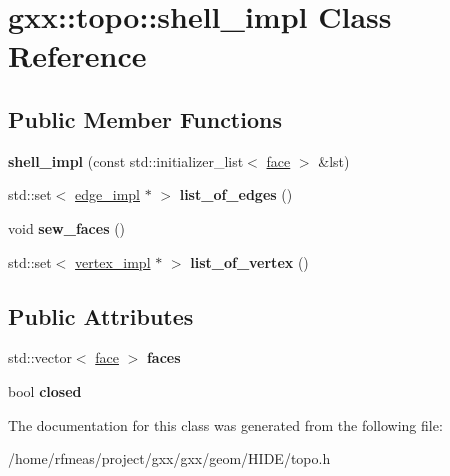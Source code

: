 \hypertarget{classgxx_1_1topo_1_1shell__impl}{}\section{gxx\+:\+:topo\+:\+:shell\+\_\+impl Class Reference}
\label{classgxx_1_1topo_1_1shell__impl}
\subsection*{Public Member Functions}
\begin{DoxyCompactItemize}
\item 
{\bfseries shell\+\_\+impl} (const std\+::initializer\+\_\+list$<$ \hyperlink{classgxx_1_1topo_1_1face}{face} $>$ \&lst)\hypertarget{classgxx_1_1topo_1_1shell__impl_a173eb830f98f5d441d6b29a3c37277ac}{}\label{classgxx_1_1topo_1_1shell__impl_a173eb830f98f5d441d6b29a3c37277ac}

\item 
std\+::set$<$ \hyperlink{classgxx_1_1topo_1_1edge__impl}{edge\+\_\+impl} $\ast$ $>$ {\bfseries list\+\_\+of\+\_\+edges} ()\hypertarget{classgxx_1_1topo_1_1shell__impl_aa905398ae38523e1c09564a4ae0a1643}{}\label{classgxx_1_1topo_1_1shell__impl_aa905398ae38523e1c09564a4ae0a1643}

\item 
void {\bfseries sew\+\_\+faces} ()\hypertarget{classgxx_1_1topo_1_1shell__impl_a093292117811a87190c1503cd08357ac}{}\label{classgxx_1_1topo_1_1shell__impl_a093292117811a87190c1503cd08357ac}

\item 
std\+::set$<$ \hyperlink{classgxx_1_1topo_1_1vertex__impl}{vertex\+\_\+impl} $\ast$ $>$ {\bfseries list\+\_\+of\+\_\+vertex} ()\hypertarget{classgxx_1_1topo_1_1shell__impl_a97b3b1234f529b2d015bea089f14c196}{}\label{classgxx_1_1topo_1_1shell__impl_a97b3b1234f529b2d015bea089f14c196}

\end{DoxyCompactItemize}
\subsection*{Public Attributes}
\begin{DoxyCompactItemize}
\item 
std\+::vector$<$ \hyperlink{classgxx_1_1topo_1_1face}{face} $>$ {\bfseries faces}\hypertarget{classgxx_1_1topo_1_1shell__impl_ada962183e1553d7f694d4b5160e74b9e}{}\label{classgxx_1_1topo_1_1shell__impl_ada962183e1553d7f694d4b5160e74b9e}

\item 
bool {\bfseries closed}\hypertarget{classgxx_1_1topo_1_1shell__impl_a78889d654ee63c8f3f02ac20d5d90186}{}\label{classgxx_1_1topo_1_1shell__impl_a78889d654ee63c8f3f02ac20d5d90186}

\end{DoxyCompactItemize}


The documentation for this class was generated from the following file\+:\begin{DoxyCompactItemize}
\item 
/home/rfmeas/project/gxx/gxx/geom/\+H\+I\+D\+E/topo.\+h\end{DoxyCompactItemize}
